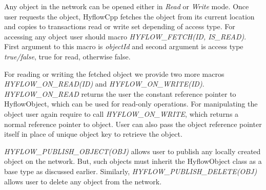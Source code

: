 \documentclass[12pt,english]{report}
\begin{document}
Any object in the network can be opened either in \emph{Read} or \emph{Write} mode. Once user requests the object, HyflowCpp fetches the object from its current location and copies to transactions read or write set depending of access type. For accessing any object user should macro \emph{HYFLOW{\_}FETCH(ID, IS{\_}READ)}. First argument to this macro is \emph{objectId} and second argument is access type \emph{true/false}, true for read, otherwise false.

For reading or writing the fetched object we provide two more macros \emph{HYFLOW{\_}ON{\_}READ(ID)} and \emph{HYFLOW{\_}ON{\_}WRITE(ID)}. \emph{HYFLOW{\_}ON{\_}READ} returns the user the constant reference pointer to HyflowObject, which can be used for read-only operations. For manipulating the object user again require to call \emph{HYFLOW{\_}ON{\_}WRITE}, which returns a normal reference pointer to object. User can also pass the object reference pointer itself in place of unique object key to retrieve the object.   

\emph{HYFLOW{\_}PUBLISH{\_}OBJECT(OBJ)} allows user to publish any locally created object on the network. But, such objects must inherit the HyflowObject class as a base type as discussed earlier. Similarly, \emph{HYFLOW{\_}PUBLISH{\_}DELETE(OBJ)} allows user to delete any object from the network.
\end{document}

